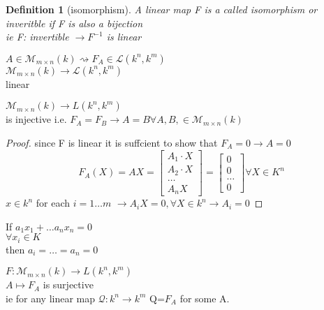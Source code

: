 \documentclass{article}
\newtheorem*{definition}{Definition}
\newcommand\m[1]{\begin{bmatrix}#1\end{bmatrix}}
\newcommand{\cd}{\cdot}
\newcommand{\mn}{m \times n}
\newenvironment{lemma}[2][Lemma]{\begin{trivlist}
\item[\hskip \labelsep {\bfseries #1}\hskip \labelsep {\bfseries #2.}]}{\end{trivlist}}
\begin{document}
\begin{definition}
[isomorphism]    A linear map F is a called isomorphism or inveritble if F is also a bijection\\
ie F: invertible $\to F^{-1}$ is linear\\
\end{definition}
$A \in \mathcal{M}_{\mn}(k) \rightsquigarrow F_A\in \mathcal{L}(k^n,k^m)$\\
$\mathcal{M}_{\mn}(k)\to \mathcal{L}(k^n,k^m)$\\
linear
\begin{theorem}
$\mathcal{M}_{\mn}(k)\to L(k^n,k^m)$\\
is injective i.e. $F_A=F_B\to A=B \forall A,B, \in \mathcal{M}_{\mn}(k)$\\
\end{theorem}

\begin{proof}
    since F is linear it is suffcient to show that $F_A=0\to A=0$
    \\$$F_A(X)=AX=\m{A_1\cd X\\A_2 \cd X\\\dots \\A_nX}=\m{0\\0\\\dots\\0} \forall X \in K^n$$
    $x \in k^n$ for each $i=1\dots m$ $\to A_iX=0, \forall X \in k^n\to A_i=0$
    
\end{proof}
\begin{lemma}
    {}If $a_1x_1+\dots a_nx_n=0$\\
    $\forall x_i \in K$\\
    then $a_i=\dots=a_n=0$
    
    
\end{lemma}
\begin{theorem}
    $F: \mathcal{M}_{\mn}(k) \to L(k^n,k^m)$\\
    $A \mapsto F_A$ is surjective\\
    ie for any linear map $\mathcal{Q}:k^n \to k^m$ Q=$F_A$ for some A.
    
\end{theorem}
\end{document}
